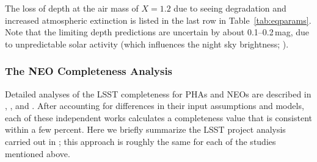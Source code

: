 The loss of depth at the air mass of $X=1.2$ due to seeing degradation
and increased atmospheric extinction is listed in the last row in Table~\ref{tab:eqparams}. Note
that the limiting depth predictions are uncertain by about 0.1--0.2\,mag,
due to unpredictable solar
activity (which influences the night sky brightness;
\citealt{2008A&A...481..575P}).




\subsubsection{The NEO Completeness Analysis}
\label{Sec:NEOc}
Detailed analyses of the LSST completeness for PHAs and NEOs are
described in \citet{2018Icar..303..181J}, \citet{2017AJ....154...12V,2017AJ....154...13V}, and \citet{2016AJ....151..172G}.
After accounting for differences in their input assumptions and models, each of these independent
works calculates a completeness value that is consistent within a few percent.
Here we briefly summarize the LSST project analysis carried out in \citet{2018Icar..303..181J}; this
approach is roughly the same for each of the studies mentioned above.


